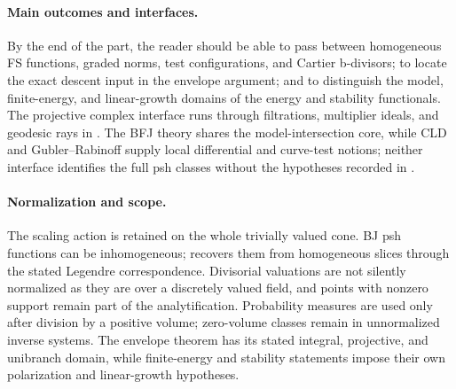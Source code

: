 \paragraph{Main outcomes and interfaces.}
\label{front:part4-main-outcomes-and-interfaces}
By the end of the part, the reader should be able to pass between homogeneous
FS functions, graded norms, test configurations, and Cartier b-divisors; to
locate the exact descent input in the envelope argument; and to distinguish
the model, finite-energy, and linear-growth domains of the energy and
stability functionals.  The projective complex interface runs through
filtrations, multiplier ideals, and geodesic rays in
.
The BFJ theory shares the model-intersection core, while CLD and
Gubler--Rabinoff supply local differential and curve-test notions; neither
interface identifies the full psh classes without the hypotheses recorded in
.

\paragraph{Normalization and scope.}
\label{front:part4-normalization-and-scope}
The scaling action is retained on the whole trivially valued cone.
BJ psh functions can be inhomogeneous;
 recovers them from homogeneous
slices through the stated Legendre correspondence. Divisorial valuations are not
silently normalized as they are over a discretely valued field, and points
with nonzero support remain part of the analytification.  Probability
measures are used only after division by a positive volume; zero-volume
classes remain in unnormalized inverse systems.  The envelope theorem has
its stated integral, projective, and unibranch domain, while finite-energy and
stability statements impose their own polarization and linear-growth
hypotheses.
